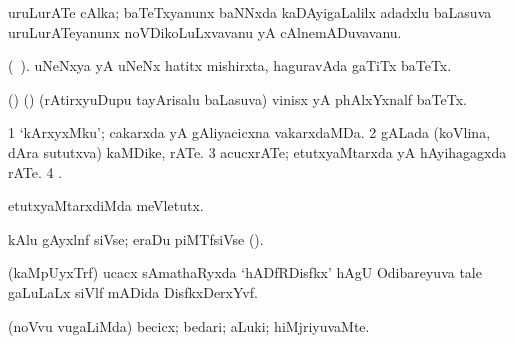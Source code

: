 {{{{{{\bentry
{}
  \gl{\nA}\bmng
uruLurATe cAlka; baTeTxyanunx baNNxda kaDAyigaLalilx adadxlu baLasuva uruLurATeyanunx noVDikoLuLxvavanu yA cAlnemADuvavanu. 
\emng
\eentry

\bentry
{}
  \gl{\nA} (\bava\ ). \bmng
uNeNxya yA uNeNx hatitx mishirxta, haguravAda gaTiTx baTeTx. 
\emng
\eentry

\bentry
{}
  \gl{\nA}\bmng
(\birx) (\kanmu) (rAtirxyuDupu tayArisalu baLasuva) vinisx yA phAlxYxnalf baTeTx. 
\emng
\eentry

\bentry
{} 
\gl{\nA}
\expl{}
\bmng
\bnum
\num{1} `kArxyxMku'; cakarxda yA gAliyacicxna vakarxdaMDa. 
\num{2} gALada (koVlina, dAra sututxva) kaMDike, rATe. 
\num{3} acucxrATe; etutxyaMtarxda yA hAyihagagxda rATe. 
\num{4} . 
\enum
\emng
\eentry

\bentry
{} 
\gl{\sakirx}
\bmng
etutxyaMtarxdiMda meVletutx. 
\emng
\eentry

\bentry
{} 
\gl{\nA}
\expl{}
\bmng
kAlu gAyxlnf siVse; eraDu piMTfsiVse (). 
\emng
\eentry

\bentry
{} 
\gl{\nA}
\bmng
(kaMpUyxTrf) ucacx sAmathaRyxda `hADfRDisfkx' hAgU Odibareyuva tale gaLuLaLx siVlf mADida DisfkxDerxYvf. 
\emng
\eentry

\bentry
{}
 \gl{\nA}\bmng
{} 
\emng
\eentry

\bentry
{}
  \gl{\kirxvi}\bmng
(noVvu \mo vugaLiMda) becicx; bedari; aLuki; hiMjriyuvaMte. 
\emng
\eentry

}}}}}}
